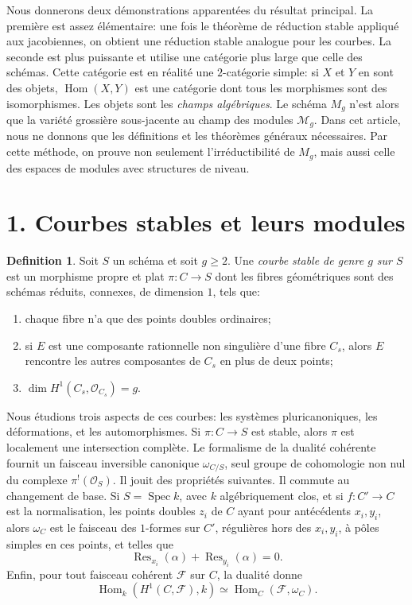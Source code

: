 \documentclass[11pt]{article}
\DeclareMathOperator{\Spec}{Spec}
\DeclareMathOperator{\Hom}{Hom}
\theoremstyle{plain}
\theoremstyle{definition}
\newtheorem*{definition*}{Definition}
\theoremstyle{remark}
\begin{document}
Nous donnerons deux démonstrations apparentées du résultat principal. La première est assez élémentaire: une fois le théorème de réduction stable appliqué aux jacobiennes, on obtient une réduction stable analogue pour les courbes. La seconde est plus puissante et utilise une catégorie plus large que celle des schémas. Cette catégorie est en réalité une \(2\)-catégorie simple: si \(X\) et \(Y\) en sont des objets, \(\Hom(X,Y)\) est une catégorie dont tous les morphismes sont des isomorphismes. Les objets sont les \emph{champs algébriques}. Le schéma \(M_g\) n'est alors que la variété grossière sous-jacente au champ des modules \(\mathcal M_g\). Dans cet article, nous ne donnons que les définitions et les théorèmes généraux nécessaires. Par cette méthode, on prouve non seulement l'irréductibilité de \(M_g\), mais aussi celle des espaces de modules avec structures de niveau.

\section*{1. Courbes stables et leurs modules}

\begin{definition*}
Soit \(S\) un schéma et soit \(g\geq 2\). Une \emph{courbe stable de genre \(g\) sur \(S\)} est un morphisme propre et plat \(\pi:C\to S\) dont les fibres géométriques sont des schémas réduits, connexes, de dimension \(1\), tels que:
\begin{enumerate}[label=(\roman*)]
\item chaque fibre n'a que des points doubles ordinaires;
\item si \(E\) est une composante rationnelle non singulière d'une fibre \(C_s\), alors \(E\) rencontre les autres composantes de \(C_s\) en plus de deux points;
\item \(\dim H^1(C_s,\mathcal O_{C_s})=g\).
\end{enumerate}
\end{definition*}

Nous étudions trois aspects de ces courbes: les systèmes pluricanoniques, les déformations, et les automorphismes. Si \(\pi:C\to S\) est stable, alors \(\pi\) est localement une intersection complète. Le formalisme de la dualité cohérente fournit un faisceau inversible canonique \(\omega_{C/S}\), seul groupe de cohomologie non nul du complexe \(\pi^!(\mathcal O_S)\). Il jouit des propriétés suivantes. Il commute au changement de base. Si \(S=\Spec k\), avec \(k\) algébriquement clos, et si \(f:C'\to C\) est la normalisation, les points doubles \(z_i\) de \(C\) ayant pour antécédents \(x_i,y_i\), alors \(\omega_C\) est le faisceau des \(1\)-formes sur \(C'\), régulières hors des \(x_i,y_i\), à pôles simples en ces points, et telles que
\[
 \operatorname{Res}_{x_i}(\alpha)+\operatorname{Res}_{y_i}(\alpha)=0.
\]
Enfin, pour tout faisceau cohérent \(\mathcal F\) sur \(C\), la dualité donne
\[
 \Hom_k(H^1(C,\mathcal F),k)\simeq \Hom_C(\mathcal F,\omega_C).
\]
\end{document}
